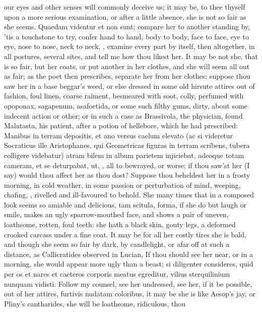{our eyes and other senses will commonly deceive us; it may be, to thee
thyself upon a more serious examination, or after a little absence, she
is not so fair as she seems. Quaedam videntur et non sunt; compare her
to another standing by, 'tis a touchstone to try, confer hand to hand,
body to body, face to face, eye to eye, nose to nose, neck to neck,
\etc{}, examine every part by itself, then altogether, in all postures,
several sites, and tell me how thou likest her. It may be not she, that
is so fair, but her coats, or put another in her clothes, and she will
seem all out as fair; as the poet then prescribes, separate her
from her clothes: suppose thou saw her in a base beggar's weed, or else
dressed in some old hirsute attires out of fashion, foul linen, coarse
raiment, besmeared with soot, colly, perfumed with opoponax, sagapenum,
asafoetida, or some such filthy gums, dirty, about some indecent action
or other; or in such a case as Brassivola, the physician, found
Malatasta, his patient, after a potion of hellebore, which he had
prescribed: Manibus in terram depositis, et ano versus caelum elevato
(ac si videretur Socraticus ille Aristophanes, qui Geometricas figuras
in terram scribens, tubera colligere videbatur) atram bilem in album
parietem injiciebat, adeoque totam cameram, et se deturpabat, ut, \etc{},
all to bewrayed, or worse; if thou saw'st her (I say) would thou affect
her as thou dost? Suppose thou beheldest her in a  frosty
morning, in cold weather, in some passion or perturbation of mind,
weeping, chafing, \etc{}, rivelled and ill-favoured to behold. She many
times that in a composed look seems so amiable and delicious, tam
scitula, forma, if she do but laugh or smile, makes an ugly
sparrow-mouthed face, and shows a pair of uneven, loathsome, rotten,
foul teeth: she hath a black skin, gouty legs, a deformed crooked
carcass under a fine coat. It may be for all her costly tires she is
bald, and though she seem so fair by dark, by candlelight, or afar off
at such a distance, as Callicratides observed in Lucian, If thou
should see her near, or in a morning, she would appear more ugly than a
beast; si diligenter consideres, quid per os et nares et caeteros
corporis meatus egreditur, vilius sterquilinium nunquam vidisti. Follow
my counsel, see her undressed, see her, if it be possible, out of her
attires, furtivis nudatam coloribus, it may be she is like Aesop's jay,
or Pliny's cantharides, she will be loathsome, ridiculous, thou
}
